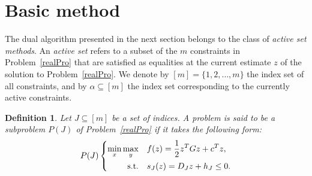 \documentclass{article}
\newtheorem{definition}{Definition}
\begin{document}
	
	\section{Basic method}\label{section3}
	The dual algorithm presented in the next section belongs to the class of \emph{active set methods}. 
	An \emph{active set} refers to a subset of the $m$ constraints in Problem~\eqref{realPro} that are satisfied as equalities at the current estimate $z$ of the solution to Problem~\eqref{realPro}. 
	We denote by $[m] = \{1, 2, \ldots, m\}$ the index set of all constraints, and by $\alpha \subseteq [m]$ the index set corresponding to the currently active constraints.
	
 	\begin{definition}
		Let $J \subseteq [m]$ be a set of indices. 
		A problem is said to be a \emph{subproblem} $P(J)$ of Problem~\eqref{realPro} if it takes the following form:
		\begin{align}
			P(J)\left\lbrace\begin{aligned}
				\min_{x}\max_{y}\quad& f(z) = \frac{1}{2}z^{T}Gz + c^{T}z,\\
				{\rm s.t.}\quad& s_{J}(z) = D_{J}z + h_{J} \leq 0.
			\end{aligned}\right.
		\end{align}
	\end{definition}
	
\end{document}
